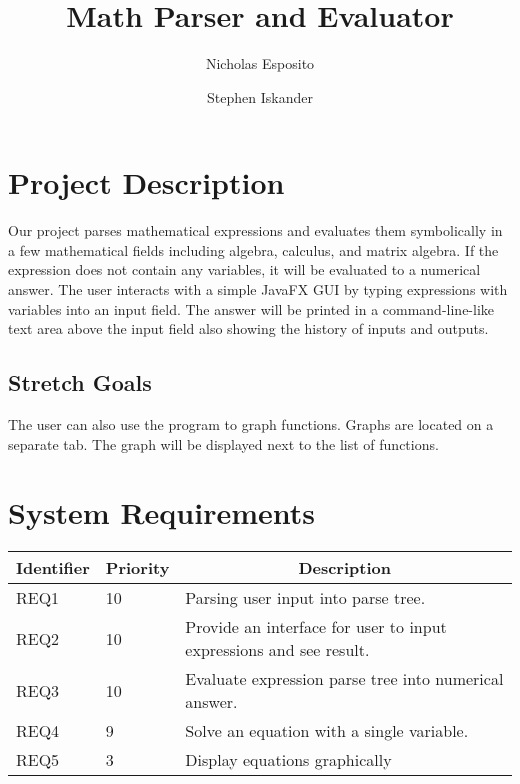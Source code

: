 \documentclass[letterpaper]{article}
\begin{document}
\title{\textbf{Math Parser and Evaluator}}
\author{Nicholas Esposito \and Stephen Iskander}

\maketitle

\section{Project Description}
Our project parses mathematical expressions and evaluates them symbolically in a few mathematical fields including algebra, calculus, and matrix algebra.
If the expression does not contain any variables, it will be evaluated to a numerical answer.
The user interacts with a simple JavaFX GUI by typing expressions with variables into an input field.
The answer will be printed in a command-line-like text area above the input field also showing the history of inputs and outputs.


\subsection{Stretch Goals}
The user can also use the program to graph functions.
Graphs are located on a separate tab.
The graph will be displayed next to the list of functions.


\section{System Requirements}

\begin{tabular}{|l|l|l|}
\hline
\multicolumn{1}{|c|}{\textbf{Identifier}} & \multicolumn{1}{c|}{\textbf{Priority}} & \multicolumn{1}{c|}{\textbf{Description}} \\ \hline
REQ1 & 10 & Parsing user input into parse tree. \\ \hline
REQ2 & 10 & Provide an interface for user to input expressions and see result.\\ \hline
REQ3 & 10 & Evaluate expression parse tree into numerical answer. \\ \hline
REQ4 & 9  & Solve an equation with a single variable. \\ \hline
REQ5 & 3  & Display equations graphically \\ \hline
\end{tabular}
\end{document}
